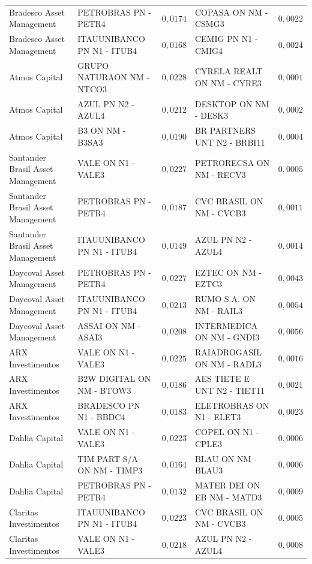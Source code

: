 \documentclass[11pt,a4paper]{article}
\begin{document}
\begin{center}
\begin{longtable}{@{}lp{3.9cm}rp{3.9cm}r@{}}
Bradesco Asset Management & PETROBRAS PN - PETR4 & $0{,}0174$ & COPASA ON NM - CSMG3 & $0{,}0022$ \\
Bradesco Asset Management & ITAUUNIBANCO PN N1 - ITUB4 & $0{,}0168$ & CEMIG PN N1 - CMIG4 & $0{,}0024$ \\
Atmos Capital & GRUPO NATURAON NM - NTCO3 & $0{,}0228$ & CYRELA REALT ON NM - CYRE3 & $0{,}0001$ \\
Atmos Capital & AZUL PN N2 - AZUL4 & $0{,}0212$ & DESKTOP ON NM - DESK3 & $0{,}0002$ \\
Atmos Capital & B3 ON NM - B3SA3 & $0{,}0190$ & BR PARTNERS UNT N2 - BRBI11 & $0{,}0004$ \\
Santander Brasil Asset Management & VALE ON N1 - VALE3 & $0{,}0227$ & PETRORECSA ON NM - RECV3 & $0{,}0005$ \\
Santander Brasil Asset Management & PETROBRAS PN - PETR4 & $0{,}0187$ & CVC BRASIL ON NM - CVCB3 & $0{,}0011$ \\
Santander Brasil Asset Management & ITAUUNIBANCO PN N1 - ITUB4 & $0{,}0149$ & AZUL PN N2 - AZUL4 & $0{,}0014$ \\
Daycoval Asset Management & PETROBRAS PN - PETR4 & $0{,}0227$ & EZTEC ON NM - EZTC3 & $0{,}0043$ \\
Daycoval Asset Management & ITAUUNIBANCO PN N1 - ITUB4 & $0{,}0213$ & RUMO S.A. ON NM - RAIL3 & $0{,}0054$ \\
Daycoval Asset Management & ASSAI ON NM - ASAI3 & $0{,}0208$ & INTERMEDICA ON NM - GNDI3 & $0{,}0056$ \\
ARX Investimentos & VALE ON N1 - VALE3 & $0{,}0225$ & RAIADROGASIL ON NM - RADL3 & $0{,}0016$ \\
ARX Investimentos & B2W DIGITAL ON NM - BTOW3 & $0{,}0186$ & AES TIETE E UNT N2 - TIET11 & $0{,}0021$ \\
ARX Investimentos & BRADESCO PN N1 - BBDC4 & $0{,}0183$ & ELETROBRAS ON N1 - ELET3 & $0{,}0023$ \\
Dahlia Capital & VALE ON N1 - VALE3 & $0{,}0223$ & COPEL ON N1 - CPLE3 & $0{,}0006$ \\
Dahlia Capital & TIM PART S/A ON NM - TIMP3 & $0{,}0164$ & BLAU ON NM - BLAU3 & $0{,}0006$ \\
Dahlia Capital & PETROBRAS PN - PETR4 & $0{,}0132$ & MATER DEI ON EB NM - MATD3 & $0{,}0009$ \\
Claritas Investimentos & ITAUUNIBANCO PN N1 - ITUB4 & $0{,}0223$ & CVC BRASIL ON NM - CVCB3 & $0{,}0005$ \\
Claritas Investimentos & VALE ON N1 - VALE3 & $0{,}0218$ & AZUL PN N2 - AZUL4 & $0{,}0008$ \\

\end{longtable}
\end{center}
\end{document}
